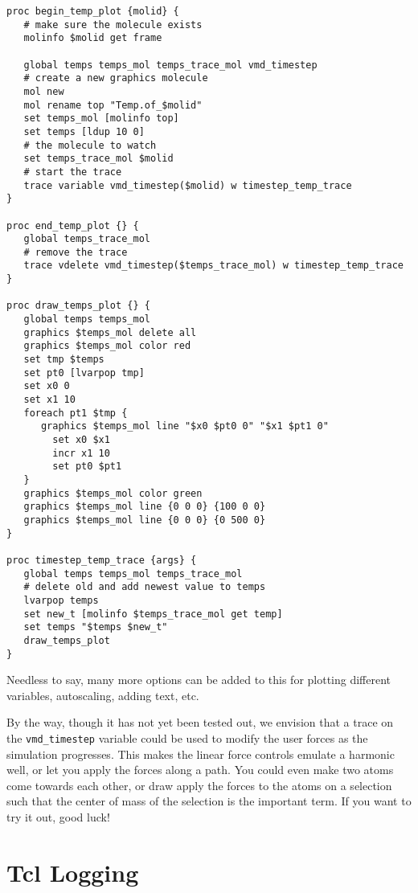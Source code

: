 \begin{verbatim}
proc begin_temp_plot {molid} {
   # make sure the molecule exists
   molinfo $molid get frame

   global temps temps_mol temps_trace_mol vmd_timestep
   # create a new graphics molecule
   mol new
   mol rename top "Temp.of_$molid"
   set temps_mol [molinfo top]
   set temps [ldup 10 0]
   # the molecule to watch
   set temps_trace_mol $molid
   # start the trace
   trace variable vmd_timestep($molid) w timestep_temp_trace
}

proc end_temp_plot {} {
   global temps_trace_mol
   # remove the trace
   trace vdelete vmd_timestep($temps_trace_mol) w timestep_temp_trace
}

proc draw_temps_plot {} {
   global temps temps_mol
   graphics $temps_mol delete all
   graphics $temps_mol color red
   set tmp $temps
   set pt0 [lvarpop tmp]
   set x0 0
   set x1 10
   foreach pt1 $tmp {
      graphics $temps_mol line "$x0 $pt0 0" "$x1 $pt1 0"
        set x0 $x1
        incr x1 10
        set pt0 $pt1
   }
   graphics $temps_mol color green
   graphics $temps_mol line {0 0 0} {100 0 0}
   graphics $temps_mol line {0 0 0} {0 500 0}
}

proc timestep_temp_trace {args} {
   global temps temps_mol temps_trace_mol
   # delete old and add newest value to temps
   lvarpop temps
   set new_t [molinfo $temps_trace_mol get temp]
   set temps "$temps $new_t"
   draw_temps_plot
}
\end{verbatim}


Needless to say, many more options can be added to this for plotting
different variables, autoscaling, adding text, etc.  

By the way, though it has not yet been tested out, we envision that a
trace on the {\tt vmd\_timestep} variable could be used to modify the
user forces as the simulation progresses.  This makes the linear force
controls emulate a harmonic well, or let you apply the forces along a
path.  You could even make two atoms come towards each other, or draw
apply the forces to the atoms on a selection such that the center of
mass of the selection is the important term.  If you want to try it out, good
luck!

\section{Tcl Logging}

